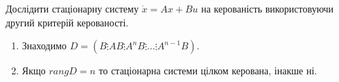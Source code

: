 \begin{problem*}
	Дослідити стаціонарну систему $\dot x = A x + B u$ на керованість використовуючи другий критерій керованості.
\end{problem*}

\begin{algorithm}
	\begin{enumerate}
		\item Знаходимо $D = \left(B \vdots AB \vdots A^nB \vdots\ldots\vdots A^{n-1}B\right)$.
		\item Якщо $rang D = n$ то стаціонарна системи цілком керована, інакше ні.
	\end{enumerate}
\end{algorithm}
